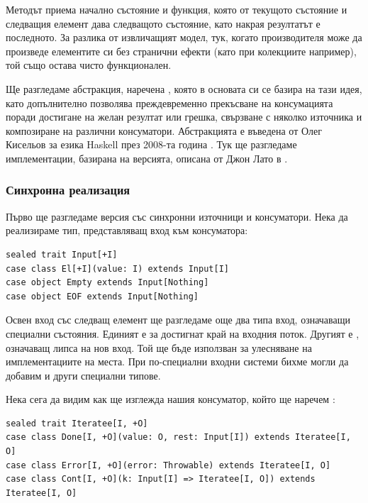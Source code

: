 Методът приема начално състояние и функция, която от текущото състояние и следващия елемент дава следващото състояние, като накрая резултатът е последното. За разлика от извличащият модел, тук, когато производителя може да произведе елементите си без странични ефекти (като при колекциите например), той също остава чисто функционален.	

Ще разгледаме абстракция, наречена , която в основата си се базира на тази идея, като допълнително позволява преждевременно прекъсване на консумацията поради достигане на желан резултат или грешка, свързване с няколко източника и композиране на различни консуматори. Абстракцията е въведена от Олег Кисельов за езика Haskell през 2008-та година \cite{kiselyov2008Streams, kiselyov2012Iteratee}. Тук ще разгледаме имплементации, базирана на версията, описана от Джон Лато в \cite{lato2010Iteratee}.

\subsubsection{Синхронна реализация}

Първо ще разгледаме версия със синхронни източници и консуматори. Нека да реализираме тип, представляващ вход към консуматора:

\begin{lstlisting}
sealed trait Input[+I]
case class El[+I](value: I) extends Input[I]
case object Empty extends Input[Nothing]
case object EOF extends Input[Nothing]
\end{lstlisting}

Освен вход със следващ елемент  ще разгледаме още два типа вход, означаващи специални състояния. Единият е  за достигнат край на входния поток. Другият е , означаващ липса на нов вход. Той ще бъде използван за улесняване на имплементациите на места. При по-специални входни системи бихме могли да добавим и други специални типове.

Нека сега да видим как ще изглежда нашия консуматор, който ще наречем :

\begin{lstlisting}
sealed trait Iteratee[I, +O]
case class Done[I, +O](value: O, rest: Input[I]) extends Iteratee[I, O]
case class Error[I, +O](error: Throwable) extends Iteratee[I, O]
case class Cont[I, +O](k: Input[I] => Iteratee[I, O]) extends Iteratee[I, O]
\end{lstlisting}

